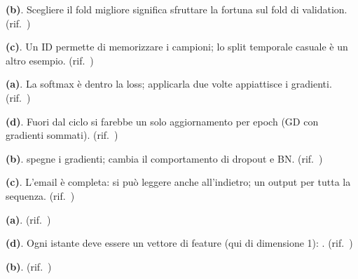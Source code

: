 \begin{soluzione}
\textbf{(b)}. Scegliere il fold migliore significa sfruttare la fortuna sul fold di validation. (rif.\ )
\end{soluzione}

\begin{soluzione}
\textbf{(c)}. Un ID permette di memorizzare i campioni; lo split temporale casuale è un altro esempio. (rif.\ )
\end{soluzione}

\begin{soluzione}
\textbf{(a)}. La softmax è dentro la loss; applicarla due volte appiattisce i gradienti. (rif.\ )
\end{soluzione}

\begin{soluzione}
\textbf{(d)}. Fuori dal ciclo si farebbe un solo aggiornamento per epoch (GD con gradienti sommati). (rif.\ )
\end{soluzione}

\begin{soluzione}
\textbf{(b)}.  spegne i gradienti;  cambia il comportamento di dropout e BN. (rif.\ )
\end{soluzione}

\begin{soluzione}
\textbf{(c)}. L'email è completa: si può leggere anche all'indietro; un output per tutta la sequenza. (rif.\ )
\end{soluzione}

\begin{soluzione}
\textbf{(a)}. (rif.\ )
\end{soluzione}

\begin{soluzione}
\textbf{(d)}. Ogni istante deve essere un vettore di feature (qui di dimensione 1): . (rif.\ )
\end{soluzione}

\begin{soluzione}
\textbf{(b)}. (rif.\ )
\end{soluzione}

